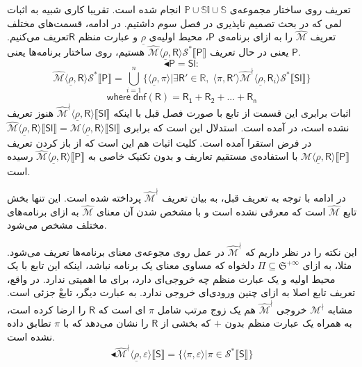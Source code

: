 تعریف روی ساختار مجموعه‌ی 
$\mathbb{P \cup Sl \cup S}$
انجام شده است. تقریبا کاری شبیه به اثبات لمی که در بحث تصمیم ناپذیری در فصل سوم داشتیم.
در ادامه، قسمت‌های مختلف تعریف $\mathcal{\hat{M}}$ را به ازای برنامه‌ی $\mathsf{P}$، محیط اولیه‌ی $\underline{\rho}$ و عبارت منظم $\mathsf{R}$تعریف می‌کنیم. یعنی در حال تعریف 
$\mathcal{\hat{M}} \langle \underline{\rho} , \mathsf{R} \rangle \mathcal{S}^* 
\llbracket \mathsf{P} \rrbracket$
هستیم، روی ساختار برنامه‌ها یعنی $\mathsf{P}$.
$$\blacktriangleleft \mathsf{P=Sl:}$$
$$\mathcal{\hat{M}} \langle \underline{\rho} , \mathsf{R} \rangle \mathcal{S}^* \llbracket \mathsf{P} \rrbracket=
\bigcup_{i=1}^n \{\langle \underline{\rho} , \pi \rangle | \exists \mathsf{R'} \in \mathbb{R}, \; \langle \pi , \mathsf{R'} \rangle \mathcal{\hat{M}^\nmid}
\langle \underline{\rho}, \mathsf{R}_i \rangle \mathcal{S}^* \llbracket \mathsf{Sl} \rrbracket \}
$$  
$$\mathsf{where\; dnf(R)=R_1 + R_2 + ... + R_n}$$
اثبات برابری این قسمت از تابع با صورت فصل قبل با اینکه 
$\mathcal{\hat{M}^\nmid} \langle \underline{\rho}, \mathsf{R} \rangle \llbracket \mathsf{Sl} \rrbracket$
هنوز تعریف نشده است، در \cite{calcul} آمده است. استدلال این است که برابری 
$\mathcal{\hat{M}} \langle \underline{\rho}, \mathsf{R} \rangle \llbracket \mathsf{Sl} \rrbracket=
\mathcal{{M}} \langle \underline{\rho}, \mathsf{R} \rangle \llbracket \mathsf{Sl} \rrbracket$
در فرض استقرا آمده است. کلیت اثبات هم این است که از باز کردن تعریف
$\mathcal{{M}} \langle \underline{\rho}, \mathsf{R} \rangle \llbracket \mathsf{P} \rrbracket$
با استفاده‌ی مستقیم تعاریف و بدون تکنیک خاصی به 
$\mathcal{\hat{M}} \langle \underline{\rho}, \mathsf{R} \rangle \llbracket \mathsf{P} \rrbracket$
رسیده است.

در ادامه با توجه به تعریف قبل، به بیان تعریف 
$\mathcal{\hat{M}^\nmid}$
پرداخته شده است. این تنها بخش تابع $\mathcal{\hat{M}}$ است که معرفی نشده است و با مشخص شدن آن معنای 
$\mathcal{\hat{M}}$
به ازای برنامه‌های مختلف مشخص می‌شود. 

این نکته را در نظر داریم که 
$\mathcal{\hat{M}^\nmid}$
در عمل روی مجوعه‌ی معنای برنامه‌ها تعریف می‌شود. مثلا، به ازای  
$\Pi \subseteq \mathfrak{S}^{+\infty}$
دلخواه که مساوی معنای یک برنامه نباشد، اینکه این تابع با یک محیط اولیه و یک عبارت منظم چه خروجی‌ای دارد، برای ما اهمیتی ندارد. در واقع، تعریف تابع اصلا به ازای چنین ورودی‌ای خروجی ندارد. به عبارت دیگر، تابعْ جزئی است. مشابه 
$\mathcal{M^\nmid}$
خروجی 
$\mathcal{\hat{M}^\nmid}$
هم یک زوج مرتب شامل $\pi$ ای است که $\mathsf{R}$ را ارضا کرده است، به همراه یک عبارت منظم بدون $+$ که بخشی از $\mathsf{R}$ را نشان می‌دهد که با $\pi$ تطابق داده نشده است.
$$\blacktriangleleft\mathcal{\hat{M}^\nmid} \langle \underline{\rho}, \mathsf{\varepsilon} \rangle \llbracket \mathsf{S} \rrbracket
=
\{\langle \pi , \varepsilon \rangle | \pi \in \mathcal{S}^* \llbracket \mathsf{S} \rrbracket \}$$

